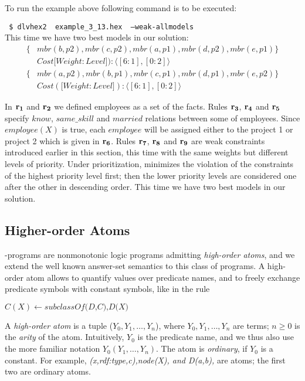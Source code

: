 \documentclass[a4paper, titlepage]{article}
\newcommand\mycenterline[1]{\par\smallskip\centerline{#1} \smallskip}
\newcommand\leftaligned[1]{\par \smallskip #1 \smallskip\\}
\newcommand{\row}[1]{%
  \ensuremath{\color{black}\ensuremath{\mathbf{#1}} \color{black}}%
}
\begin{document}
To run the example above following command is to be executed:
%
\leftaligned{\texttt{ \$ dlvhex2 \ example\_3\_13.hex \ --weak-allmodels}}
%
This time we have two best 
models in our solution:
\begin{align*}
\{ & \mathit{mbr}(b,p2), \mathit{mbr}(c,p2), 
   \mathit{mbr}(a,p1), \mathit{mbr}(d,p2), 
   \mathit{mbr}(e,p1) \} \\
   & \mathit{Cost} [ \mathit{Weight:Level]}):  \langle 
   [6:1],[0:2] \rangle \\ 
\{ & \mathit{mbr}(a,p2), \mathit{mbr}(b,p1), 
   \mathit{mbr}(c,p1), \mathit{mbr}(d,p1), 
   \mathit{mbr}(e,p2) \} \\
   & \mathit{Cost} ([ \mathit{Weight:Level]}):\langle 
   [6:1],[0:2] \rangle
\end{align*}

In $\row{r_1}$ and $\row{r_2}$ we defined employees as a set of the 
facts. Rules $\row{r_3}$, $\row{r_4}$ and $\row{r_5}$ specify $\mathit{know}$, 
$\mathit{same\_skill}$ and $\mathit{married}$ relations 
between some of employees. Since $\mathit{employee}(X)$ is 
true, each $\mathit{employee}$ will be assigned either to 
the project 1 or project 2 which is given in $\row{r_6}$. Rules $\row{r_7}$, $\row{r_8}$ and $\row{r_9}$ 
are weak constraints introduced earlier in this section, this time with the 
same weights but different levels of priority. Under 
prioritization, \dlvhex{} minimizes the violation of 
the constraints of the highest priority level first; then 
the lower priority levels are considered one after the 
other in descending order. This time we have two best 
models in our solution.     


\subsection{Higher-order Atoms}
\hex{}-programs are 
nonmonotonic logic programs admitting \emph{high-order 
atoms}, and we extend the well known answer-set semantics 
to this class of programs. A high-order 
atom allows to quantify values over predicate names, and to 
freely exchange predicate symbols with constant symbols, 
like in the rule
%
\mycenterline{$C(X) \leftarrow \textit{subclassOf(D,C),D(X)}$}
%
A \textit{high-order atom} is a tuple ($Y_0, Y_1,
\dots,Y_n$), where $Y_0, Y_1,\dots,Y_n$ are terms; $ n \ge 
0$ is the \textit{arity} of the atom. Intuitively, $Y_0$ 
is the predicate name, and we thus also use the more 
familiar notation $Y_0(Y_1,\dots,Y_n)$. The atom is 
\textit{ordinary}, if $Y_0$ is a constant. For example, 
\textit{(x,rdf:type,c),node(X), and D(a,b),} are atoms; the 
first two are ordinary atoms.
\end{document}
